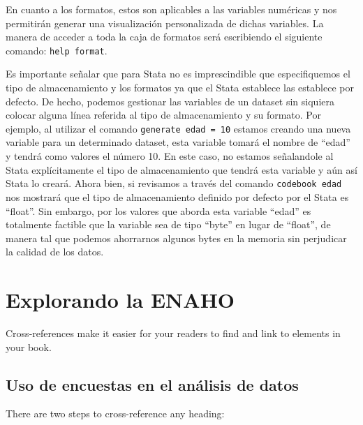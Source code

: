 \documentclass[
]{book}
\theoremstyle{definition}
\theoremstyle{definition}
\theoremstyle{definition}
\theoremstyle{definition}
\theoremstyle{remark}
\begin{document}
En cuanto a los formatos, estos son aplicables a las variables numéricas y nos permitirán generar una visualización personalizada de dichas variables. La manera de acceder a toda la caja de formatos será escribiendo el siguiente comando: \texttt{help\ format}.

Es importante señalar que para Stata no es imprescindible que especifiquemos el tipo de almacenamiento y los formatos ya que el Stata establece las establece por defecto. De hecho, podemos gestionar las variables de un dataset sin siquiera colocar alguna línea referida al tipo de almacenamiento y su formato. Por ejemplo, al utilizar el comando \texttt{generate\ edad\ =\ 10} estamos creando una nueva variable para un determinado dataset, esta variable tomará el nombre de ``edad'' y tendrá como valores el número 10. En este caso, no estamos señalandole al Stata explícitamente el tipo de almacenamiento que tendrá esta variable y aún así Stata lo creará. Ahora bien, si revisamos a través del comando \texttt{codebook\ edad} nos mostrará que el tipo de almacenamiento definido por defecto por el Stata es ``float''. Sin embargo, por los valores que aborda esta variable ``edad'' es totalmente factible que la variable sea de tipo ``byte'' en lugar de ``float'', de manera tal que podemos ahorrarnos algunos bytes en la memoria sin perjudicar la calidad de los datos.

\hypertarget{cross}{%
\chapter{Explorando la ENAHO}\label{cross}}

Cross-references make it easier for your readers to find and link to elements in your book.

\hypertarget{uso-de-encuestas-en-el-anuxe1lisis-de-datos}{%
\section{Uso de encuestas en el análisis de datos}\label{uso-de-encuestas-en-el-anuxe1lisis-de-datos}}

There are two steps to cross-reference any heading:
\end{document}
